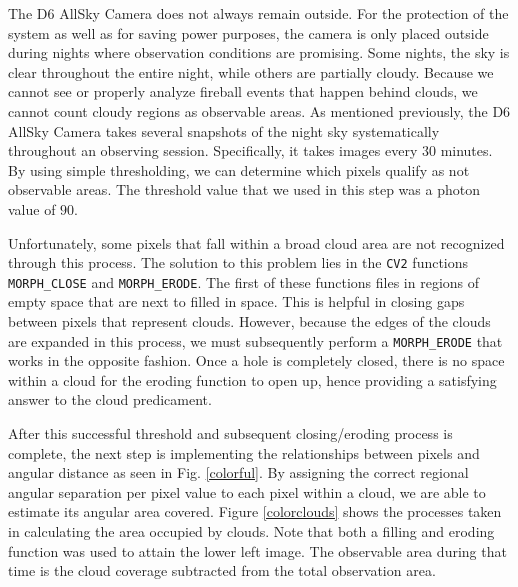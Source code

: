 The D6 AllSky Camera does not always remain outside.
For the protection of the system as well as for saving power purposes, the camera is only placed outside during nights where observation conditions are promising.
Some nights, the sky is clear throughout the entire night, while others are partially cloudy.
Because we cannot see or properly analyze fireball events that happen behind clouds, we cannot count cloudy regions as observable areas.
As mentioned previously, the D6 AllSky Camera takes several snapshots of the night sky systematically throughout an observing session.
Specifically, it takes images every $30$ minutes.
By using simple thresholding, we can determine which pixels qualify as not observable areas.
The threshold value that we used in this step was a photon value of $90$.

Unfortunately, some pixels that fall within a broad cloud area are not recognized through this process.
The solution to this problem lies in the \texttt{CV2} functions \texttt{MORPH\_CLOSE} and \texttt{MORPH\_ERODE}.
The first of these functions files in regions of empty space that are next to filled in space.
This is helpful in closing gaps between pixels that represent clouds.
However, because the edges of the clouds are expanded in this process, we must subsequently perform a \texttt{MORPH\_ERODE} that works in the opposite fashion.
Once a hole is completely closed, there is no space within a cloud for the eroding function to open up, hence providing a satisfying answer to the cloud predicament.

After this successful threshold and subsequent closing/eroding process is complete, the next step is implementing the relationships between pixels and angular distance as seen in Fig. \ref{colorful}.
By assigning the correct regional angular separation per pixel value to each pixel within a cloud, we are able to estimate its angular area covered.
Figure \ref{colorclouds} shows the processes taken in calculating the area occupied by clouds.
Note that both a filling and eroding function was used to attain the lower left image.
The observable area during that time is the cloud coverage subtracted from the total observation area.


